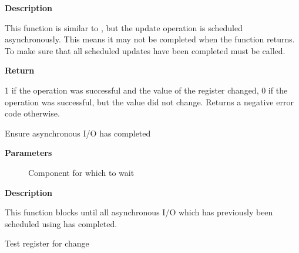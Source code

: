 \documentclass[a4paper,8pt,english]{sphinxmanual}
\begin{document}
\textbf{Description}

This function is similar to {\hyperref[sound/kernel\string-api/alsa\string-driver\string-api:c.snd_soc_component_update_bits]{\emph{}}}, but the update
operation is scheduled asynchronously. This means it may not be completed
when the function returns. To make sure that all scheduled updates have been
completed {\hyperref[sound/kernel\string-api/alsa\string-driver\string-api:c.snd_soc_component_async_complete]{\emph{}}} must be called.

\textbf{Return}

1 if the operation was successful and the value of the register
changed, 0 if the operation was successful, but the value did not change.
Returns a negative error code otherwise.

\begin{fulllineitems}
\label{sound/kernel-api/alsa-driver-api:c.snd_soc_component_async_complete}
Ensure asynchronous I/O has completed

\end{fulllineitems}


\textbf{Parameters}
\begin{description}
\item[{}] \leavevmode
Component for which to wait

\end{description}

\textbf{Description}

This function blocks until all asynchronous I/O which has previously been
scheduled using {\hyperref[sound/kernel\string-api/alsa\string-driver\string-api:c.snd_soc_component_update_bits_async]{\emph{}}} has completed.

\begin{fulllineitems}
\label{sound/kernel-api/alsa-driver-api:c.snd_soc_component_test_bits}
Test register for change

\end{fulllineitems}
\end{document}
